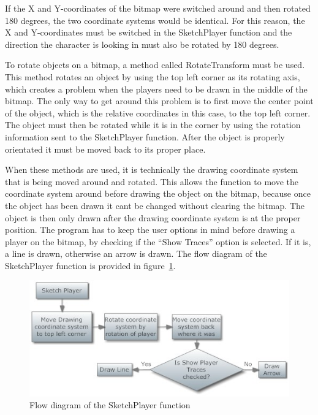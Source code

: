 If the X and Y-coordinates of the bitmap were switched around and then rotated 180 degrees, the two coordinate systems would be identical. For this reason, the X and Y-coordinates must be switched in the SketchPlayer function and the direction the character is looking in must also be rotated by 180 degrees. 

To rotate objects on a bitmap, a method called RotateTransform must be used. This method rotates an object by using the top left corner as its rotating axis, which creates a problem when the players need to be drawn in the middle of the bitmap. The only way to get around this problem is to first move the center point of the object, which is the relative coordinates in this case, to the top left corner. The object must then be rotated while it is in the corner by using the rotation information sent to the SketchPlayer function. After the object is properly orientated it must be moved back to its proper place. 

When these methods are used, it is technically the drawing coordinate system that is being moved around and rotated. This allows the function to move the coordinate system around before drawing the object on the bitmap, because once the object has been drawn it cant be changed without clearing the bitmap. The object is then only drawn after the drawing coordinate system is at the proper position. The program has to keep the user options in mind before drawing a player on the bitmap, by checking if the ``Show Traces'' option is selected. If it is, a line is drawn, otherwise an arrow is drawn.
The flow diagram of the SketchPlayer function is provided in figure~\ref{sketching}.

\begin{figure}[htbp]  
\centering
\includegraphics[scale = 0.65]{sketching.jpg}	
\caption{Flow diagram of the SketchPlayer function}
\label{sketching}
\end{figure}



